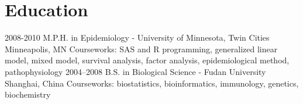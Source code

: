 \section{Education}

\begin{entrylist}
  \entry
    {2008-2010}
    {M.P.H. in Epidemiology - University of Minnesota, Twin Cities}
    {Minneapolis, MN}
    {Courseworks: SAS and R programming, generalized linear model, mixed model, survival analysis, factor analysis, epidemiological method, pathophysiology}
  \entry
    {2004–2008}
    {B.S. in Biological Science - Fudan University}
    {Shanghai, China}
    {Courseworks: biostatistics, bioinformatics, immunology, genetics, biochemistry}
\end{entrylist}
